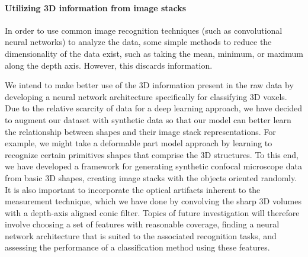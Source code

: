 \documentclass{article}
\begin{document}
\paragraph{Utilizing 3D information from image stacks}

In order to use common image recognition techniques (such as convolutional neural networks) to analyze the data, some simple methods to reduce the dimensionality of the data exist, such as taking the mean, minimum, or maximum along the depth axis. However, this discards information. 

We intend to make better use of the 3D information present in the raw data by developing a neural network architecture specifically for classifying 3D voxels\cite{DBLP:conf/iros/MaturanaS15,brock2016generative}. Due to the relative scarcity of data for a deep learning approach, we have decided to augment our dataset with synthetic data so that our model can better learn the relationship between shapes and their image stack representations. For example, we might take a deformable part model approach by learning to recognize certain primitives shapes that comprise the 3D structures. To this end, we have developed a framework for generating synthetic confocal microscope data from basic 3D shapes, creating image stacks with the objects oriented randomly. It is also important to incorporate the optical artifacts inherent to the measurement technique, which we have done by convolving the sharp 3D volumes with a depth-axis aligned conic filter. Topics of future investigation will therefore involve choosing a set of features with reasonable coverage, finding a neural network architecture that is suited to the associated recognition tasks, and assessing the performance of a classification method using these features.



\end{document}
